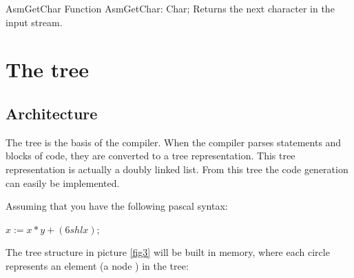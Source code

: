 \documentclass [a4paper,12pt]{article}
\begin{document}
\begin{function}{AsmGetChar}
\Declaration
Function AsmGetChar: Char;
\Description
Returns the next character in the input stream. 
\end{function}


\section{The tree}
\label{sec:mylabel2}

\subsection{Architecture}
\label{subsec:architecturenext}

The tree is the basis of the compiler. When the compiler parses statements
and blocks of code, they are converted to a tree representation. This tree
representation is actually a doubly linked list. From this tree the code
generation can easily be implemented.

Assuming that you have the following pascal syntax:


\begin{center}
$ x := x * y + (6\xspace shl \xspace x);$
\end{center}

The tree structure in picture \ref{fig3} will be built in memory, where each
circle represents an element (a node ) in the tree:
\end{document}
